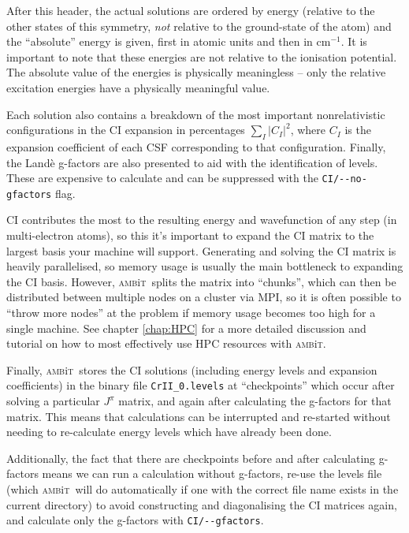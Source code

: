 \documentclass{report}
\newcommand{\ambit}{\textsc{amb}{\footnotesize i}\textsc{t}}
\begin{document}
After this header, the actual solutions are ordered by energy (relative to the other states of this
symmetry, \emph{not} relative to the ground-state of the atom) and the ``absolute'' energy is given,
first in atomic units and then in cm$^{-1}$. It is important to note that these energies are not
relative to the ionisation potential. The absolute value of the energies is physically meaningless --
only the relative excitation energies have a physically meaningful value.

Each solution also contains a breakdown of the most important nonrelativistic configurations in the CI
expansion in percentages $\displaystyle \sum_I |C_I|^2$, where $C_I$ is the expansion coefficient of
each CSF corresponding to that configuration. Finally, the Land\`{e} g-factors are also presented to aid
with the identification of levels. These are expensive to calculate and can be suppressed with the
\texttt{CI/{-}{-}no-gfactors} flag.

CI contributes the most to the resulting energy and wavefunction of any step (in multi-electron atoms),
so this it's important to expand the CI matrix to the largest basis your machine will support.
Generating and solving the CI matrix is heavily parallelised, so memory usage is usually the main
bottleneck to expanding the CI basis. However, \ambit\  splits the matrix into ``chunks'', which can then
be distributed between multiple nodes on a cluster via MPI, so it is often possible to ``throw more
nodes'' at the problem if memory usage becomes too high for a single machine. See chapter \ref{chap:HPC}
for a more detailed discussion and tutorial on how to most effectively use HPC resources with \ambit.

Finally, \ambit\  stores the CI solutions (including energy levels and expansion coefficients) in the 
binary file \texttt{CrII\_0.levels} at ``checkpoints'' which occur after solving a particular $J^{\pi}$ 
matrix, and again after calculating the g-factors for that matrix. This means that calculations can be
interrupted and re-started without needing to re-calculate energy levels which have already been done.

Additionally, the fact that there are checkpoints before and after calculating g-factors means we can
run a calculation without g-factors, re-use the levels file (which \ambit\  will do automatically if one 
with the correct file name exists in the current directory) to avoid constructing and diagonalising 
the CI matrices again, and calculate only the g-factors with \texttt{CI/{-}{-}gfactors}.
\end{document}
